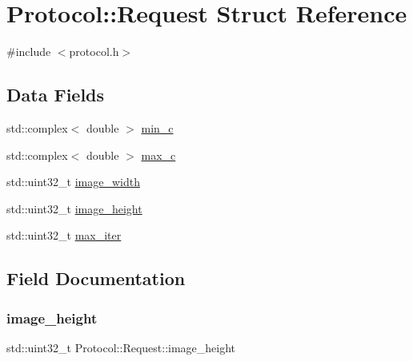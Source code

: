 \hypertarget{structProtocol_1_1Request}{}\section{Protocol\+:\+:Request Struct Reference}
\label{structProtocol_1_1Request}


{\ttfamily \#include $<$protocol.\+h$>$}

\subsection*{Data Fields}
\begin{DoxyCompactItemize}
\item 
std\+::complex$<$ double $>$ \hyperlink{structProtocol_1_1Request_a4a4739df28bbb9a1252dedeb5f918db8}{min\+\_\+c}
\item 
std\+::complex$<$ double $>$ \hyperlink{structProtocol_1_1Request_a65b9e26893f8ab218ded9bf88f7b7003}{max\+\_\+c}
\item 
std\+::uint32\+\_\+t \hyperlink{structProtocol_1_1Request_a44b8822481390a24fb2dc4b3dbb50873}{image\+\_\+width}
\item 
std\+::uint32\+\_\+t \hyperlink{structProtocol_1_1Request_adced81ab70e49c64830fe4ac4fc2c3c5}{image\+\_\+height}
\item 
std\+::uint32\+\_\+t \hyperlink{structProtocol_1_1Request_a1ab4bee193a4599f5db9281fa41f31e2}{max\+\_\+iter}
\end{DoxyCompactItemize}


\subsection{Field Documentation}
\mbox{\label{structProtocol_1_1Request_adced81ab70e49c64830fe4ac4fc2c3c5}} 
\subsubsection{\texorpdfstring{image\+\_\+height}{image\_height}}
{\footnotesize\ttfamily std\+::uint32\+\_\+t Protocol\+::\+Request\+::image\+\_\+height}

\mbox{\label{structProtocol_1_1Request_a44b8822481390a24fb2dc4b3dbb50873}} 
